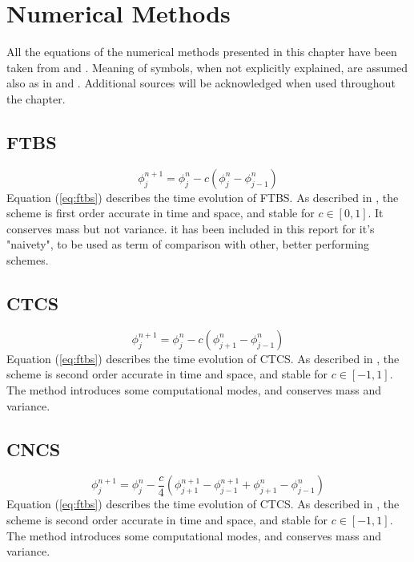 
\section{Numerical Methods}
All the equations of the numerical methods presented in this chapter have been taken from \cite{mpebook} and \cite{nmnotes}. Meaning of symbols, when not explicitly explained, are assumed also as in \cite{mpebook} and \cite{nmnotes}. Additional sources will be acknowledged when used throughout the chapter.

\subsection{FTBS}

\begin{equation}
\phi_j^{n+1}=\phi_j^{n}-c(\phi_j^{n}-\phi_{j-1}^{n})
\label{eq:ftbs}
\end{equation}
Equation (\ref{eq:ftbs}) describes the time evolution of FTBS. As described in \cite{mpebook}, the scheme is first order accurate in time and space, and stable for $c\in[0,1]$. It conserves mass but not variance. it has been included in this report for it's "naivety", to be used as term of comparison with other, better performing schemes.


\subsection{CTCS}
\begin{equation}
\phi_j^{n+1}=\phi_j^{n}-c(\phi_{j+1}^{n}-\phi_{j-1}^{n})
\label{eq:ctcs}
\end{equation}
Equation (\ref{eq:ftbs}) describes the time evolution of CTCS. As described in \cite{mpebook}, the scheme is second order accurate in time and space, and stable for $c\in[-1,1]$. The method introduces some computational modes, and conserves mass and variance.


\subsection{CNCS}
\begin{equation}
\phi_j^{n+1}=\phi_j^{n}-\frac{c}{4}(\phi_{j+1}^{n+1}-\phi_{j-1}^{n+1}+\phi_{j+1}^{n}-\phi_{j-1}^{n})
\label{eq:ctcs}
\end{equation}
Equation (\ref{eq:ftbs}) describes the time evolution of CTCS. As described in \cite{mpebook}, the scheme is second order accurate in time and space, and stable for $c\in[-1,1]$. The method introduces some computational modes, and conserves mass and variance.

